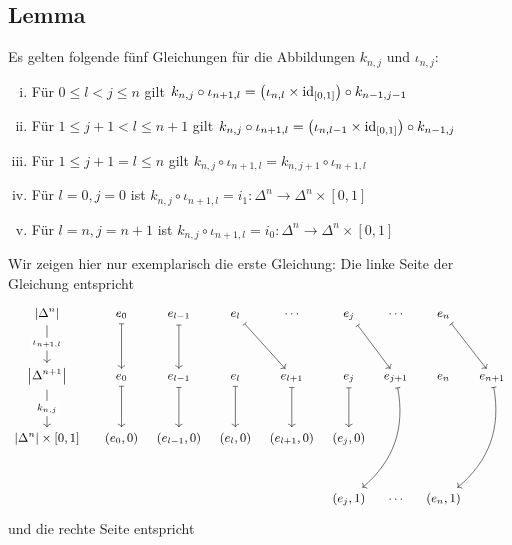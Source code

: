 \subsection[Lemma: Gleichungen für die Abbildungen aus \ref{sub:710}]{Lemma} %
\label{sub:711}
Es gelten folgende fünf Gleichungen für die Abbildungen $k_{n,j}$ und $\iota_{n,j}$:
\begin{enumerate}[(i)]
	\item Für $0 \le l < j \le n$ gilt $k_{n,j} \circ \iota_{n+1,l} = \enbrace*{\iota_{n,l} \times \id_{[0,1]}} \circ k_{n-1,j-1}$
	\item Für $1 \le j+1 < l \le n+1$ gilt $k_{n,j} \circ \iota_{n+1,l} = \enbrace*{\iota_{n,l-1} \times \id_{[0,1]}} \circ k_{n-1,j} $
	\item Für $1 \le j+1 = l \le n$ gilt $k_{n,j} \circ \iota_{n+1,l} = k_{n,j+1} \circ \iota_{n+1,l}$
	\item Für $l=0,j=0$ ist $k_{n,j} \circ \iota_{n+1,l} = i_1 :  \Delta^n \to \Delta^n \times [0,1]$
	\item Für $l=n,j=n+1$ ist $k_{n,j} \circ \iota_{n+1,l} = i_0 : \Delta^n \to \Delta^n \times [0,1]$
\end{enumerate}
Wir zeigen hier nur exemplarisch die erste Gleichung:
Die linke Seite der Gleichung entspricht
	\[
		\begin{tikzcd}[row sep=2.8em, column sep=0.5em, font=\small]
			\abs*{\Delta^n} \dar["\iota_{n+1,l}" description] && e_0 \dar[mapsto] & e_{l-1} \dar[mapsto] & e_l \drar[mapsto]& \cdots & e_j \drar[mapsto]& \cdots 
			& e_n \drar[mapsto]& \\
			\abs*{\Delta^{n+1}} \dar["k_{n,j}" description] && e_0 \dar[mapsto] & e_{l-1} \dar[mapsto] & e_l \dar[mapsto] & e_{l+1} \dar[mapsto]& e_{j} \dar[mapsto] 
			& e_{j+1} \arrow[ddl,mapsto, bend left] & e_n & e_{n+1} \arrow[ddl,mapsto, bend left] \\
			\abs*{\Delta^{n}} \times [0,1] && (e_0,0) & (e_{l-1},0) & (e_l,0) & (e_{l+1},0)& (e_j,0) & & \\
			 &&  &  &  & & (e_j,1) & \cdots & (e_n,1)
		\end{tikzcd}
	\]
	und die rechte Seite entspricht
